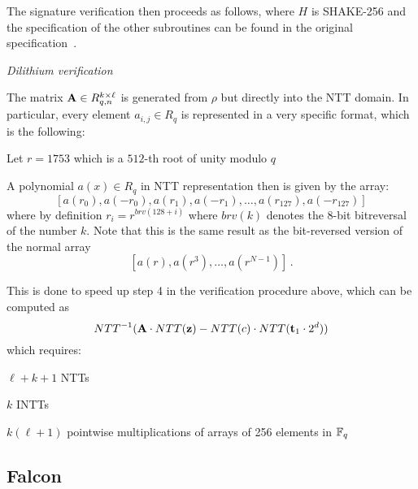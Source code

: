 The signature verification then proceeds as follows, where $H$ is SHAKE-256 and the specification
of the other subroutines can be found in the original specification~\cite{dilithium}.
\begin{algorithm}[!ht] \label{algo:dilithium_verify}
\begin{scriptsize}
\caption{\emph{Dilithium verification}}
\end{scriptsize}
\end{algorithm} 

The matrix $\mathbf{A} \in R_{q,n}^{k \times \ell}$ is generated from $\rho$ but directly into the NTT domain.
In particular, every element $a_{i,j} \in R_q$ is represented in a very specific format, which is the following:
\bit
\item Let $r = 1753$ which is a $512$-th root of unity modulo $q$
\item A polynomial $a(x) \in R_q$ in NTT representation then is given by the array:
\[ [a(r_0), a(-r_0), a(r_1), a(-r_1), \ldots, a(r_{127}), a(-r_{127})] \]
\eit
where by definition $r_i = r^{brv(128 + i)}$ where $brv(k)$ denotes the 8-bit bitreversal of the number $k$.
Note that this is the same result as the bit-reversed version of the normal array
\[  [a(r), a(r^3), \ldots, a(r^{N-1})] \, .  \]


This is done to speed up step 4 in the verification procedure above, which can be computed as 
\[ NTT^{-1} (  \mathbf{A} \cdot NTT(\mathbf{z})  - NTT(c) \cdot NTT(\mathbf{t}_1 \cdot 2^d))  \]
which requires:
\bit
\item $\ell + k + 1$ NTTs
\item $k$ INTTs
\item $k (\ell + 1)$ pointwise multiplications of arrays of 256 elements in $\mathbb{F}_q$
\eit

\subsection{Falcon}

